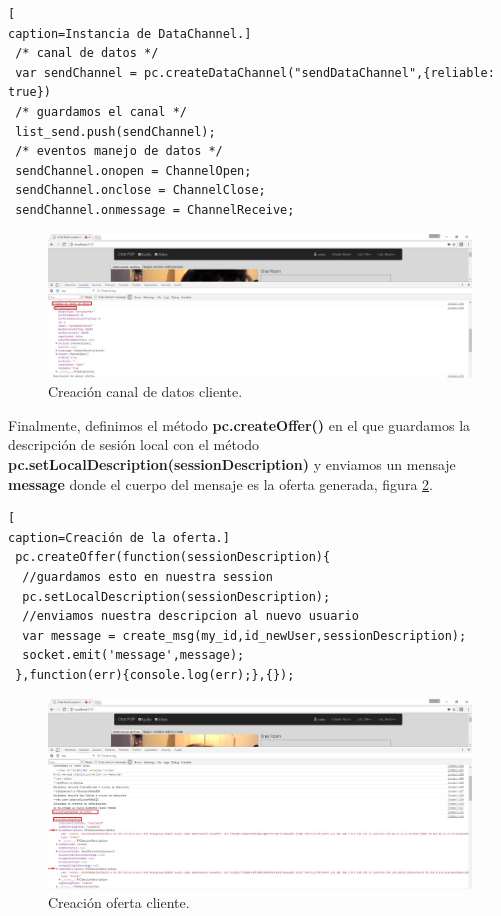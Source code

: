 \begin{lstlisting}[
caption=Instancia de DataChannel.]
 /* canal de datos */
 var sendChannel = pc.createDataChannel("sendDataChannel",{reliable: true})
 /* guardamos el canal */
 list_send.push(sendChannel);	
 /* eventos manejo de datos */
 sendChannel.onopen = ChannelOpen;
 sendChannel.onclose = ChannelClose;
 sendChannel.onmessage = ChannelReceive;
\end{lstlisting}
\begin{figure}[!h]
\centering
\includegraphics[width=0.8\linewidth]{Figures/DataChannelOffert}
\decoRule
\caption[Creación canal de datos cliente.]{Creación canal de datos cliente.}
\label{fig:DataChannelOffert}
\end{figure}
Finalmente, definimos el método \textbf{pc.createOffer()} en el que guardamos la descripción de sesión local con el método \textbf{pc.setLocalDescription(sessionDescription)} y enviamos un mensaje \textbf{message} donde el cuerpo del mensaje es la oferta generada, figura \ref{fig:OfferCliente}.
\begin{lstlisting}[
caption=Creación de la oferta.]
 pc.createOffer(function(sessionDescription){
  //guardamos esto en nuestra session
  pc.setLocalDescription(sessionDescription);
  //enviamos nuestra descripcion al nuevo usuario
  var message = create_msg(my_id,id_newUser,sessionDescription);
  socket.emit('message',message);
 },function(err){console.log(err);},{});
\end{lstlisting}
\begin{figure}[!h]
\centering
\includegraphics[width=0.8\linewidth]{Figures/OfferCliente}
\decoRule
\caption[Creación oferta cliente.]{Creación oferta cliente.}
\label{fig:OfferCliente}
\end{figure}

